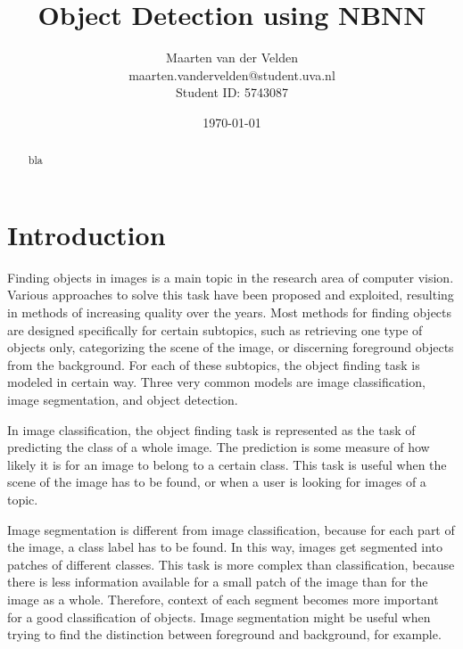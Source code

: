 \documentclass[a4paper,10pt]{article}
\title{Object Detection using NBNN}
\author{Maarten van der Velden\\maarten.vandervelden@student.uva.nl\\Student ID: 5743087}
\date{\today}
\begin{document}
\begin{titlepage}
    \vspace{10cm}
    \maketitle
    \thispagestyle{empty}
\end{titlepage}


\begin{abstract}
    bla
\end{abstract}

\section{Introduction} %
\label{sec:introduction}
Finding objects in images is a main topic in the research area of computer vision. Various approaches to solve this task have been proposed and exploited, resulting in methods of increasing quality over the years. Most methods for finding objects are designed specifically for certain subtopics, such as retrieving one type of objects only, categorizing the scene of the image, or discerning foreground objects from the background. For each of these subtopics, the object finding task is modeled in certain way. Three very common models are image classification, image segmentation, and object detection.

In image classification, the object finding task is represented as the task of predicting the class of a whole image. The prediction is some measure of how likely it is for an image to belong to a certain class. This task is useful when the scene of the image has to be found, or when a user is looking for images of a topic.

Image segmentation is different from image classification, because for each part of the image, a class label has to be found. In this way, images get segmented into patches of different classes. This task is more complex than classification, because there is less information available for a small patch of the image than for the image as a whole. Therefore, context of each segment becomes more important for a good classification of objects. Image segmentation might be useful when trying to find the distinction between foreground and background, for example.
\end{document}
